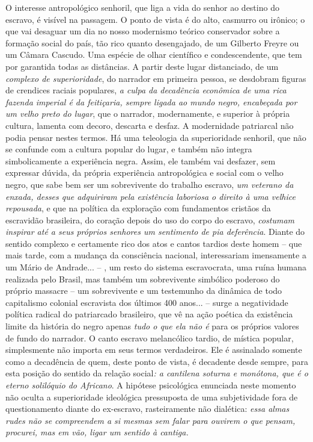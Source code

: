 O interesse antropológico senhoril, que liga a vida do senhor ao destino
do escravo, é visível na passagem. O ponto de vista é do alto, casmurro
ou irônico; o que vai desaguar um dia no nosso modernismo teórico
conservador sobre a formação social do país, tão rico quanto
desengajado, de um Gilberto Freyre ou um Câmara Cascudo. Uma espécie de
olhar científico e condescendente, que tem por garantida todas as
distâncias. A partir deste lugar distanciado, de um \emph{complexo de
superioridade}, do narrador em primeira pessoa, se desdobram figuras de
crendices raciais populares, \emph{a culpa da decadência econômica de
uma rica fazenda imperial é da feitiçaria, sempre ligada ao mundo negro,
encabeçada por um velho preto do lugar}, que o narrador, modernamente, e
superior à própria cultura, lamenta com decoro, descarta e desfaz. A
modernidade patriarcal não podia pensar nestes termos. Há uma teleologia
da superioridade senhoril, que não se confunde com a cultura popular do
lugar, e também não integra simbolicamente a experiência negra. Assim,
ele também vai desfazer, sem expressar dúvida, da própria experiência
antropológica e social com o velho negro, que sabe bem ser um
sobrevivente do trabalho escravo, \emph{um veterano da enxada, desses
que adquiriram pela existência laboriosa o direito à uma velhice
repousada}, e que na política da exploração com fundamentos cristãos da
escravidão brasileira, do coração depois do uso do corpo do escravo,
\emph{costumam inspirar até a seus próprios senhores um sentimento de
pia deferência}. Diante do sentido complexo e certamente rico dos atos e
cantos tardios deste homem -- que mais tarde, com a mudança da
consciência nacional, interessariam imensamente a um Mário de Andrade...
-- , um resto do sistema escravocrata, uma ruína humana realizada pelo
Brasil, mas também um sobrevivente simbólico poderoso do próprio
massacre -- um sobrevivente e um testemunho da dinâmica de todo
capitalismo colonial escravista dos últimos 400 anos... -- surge a
negatividade política radical do patriarcado brasileiro, que vê na ação
poética da existência limite da história do negro apenas \emph{tudo o
que ela não é} para os próprios valores de fundo do narrador. O canto
escravo melancólico tardio, de mística popular, simplesmente não importa
em seus termos verdadeiros. Ele é assinalado somente como a decadência
de quem, deste ponto de vista, é decadente desde sempre, para esta
posição do sentido da relação social\emph{: a cantilena soturna e
monótona, que é o eterno solilóquio do Africano}. A hipótese psicológica
enunciada neste momento não oculta a superioridade ideológica
pressuposta de uma subjetividade fora de questionamento diante do
ex-escravo, rasteiramente não dialética: \emph{essa almas rudes não se
compreendem a si mesmas sem falar para ouvirem o que pensam, procurei,
mas em vão, ligar um sentido à cantiga. }

